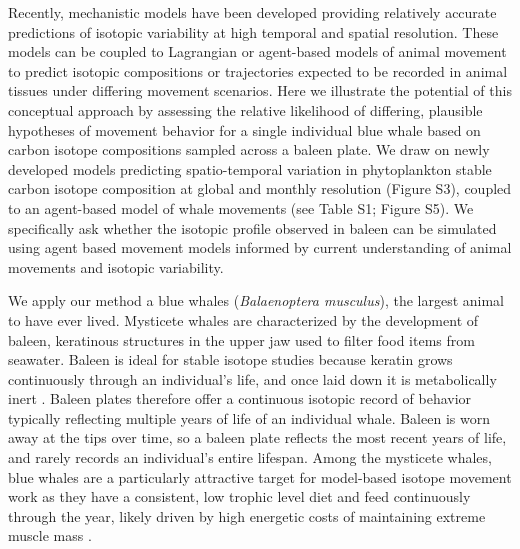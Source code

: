 \documentclass[a4paper,12pt]{article}
\begin{document}
Recently, mechanistic models have been developed providing relatively accurate predictions of isotopic variability at high temporal and spatial resolution. 
These models can be coupled to Lagrangian or agent-based models of animal movement to predict isotopic compositions or trajectories expected to be recorded in animal tissues under differing movement scenarios. 
Here we illustrate the potential of this conceptual approach by assessing the relative likelihood of differing, plausible hypotheses of movement behavior for a single individual blue whale based on carbon isotope compositions sampled across a baleen plate.  
We draw on newly developed models predicting spatio-temporal variation in phytoplankton stable carbon isotope composition at global and monthly resolution \citep{magozzi2017using} (Figure S3), coupled to an agent-based model of whale movements (see Table S1; Figure S5). 
We specifically ask whether the isotopic profile observed in baleen can be simulated using agent based movement models informed by current understanding of animal movements and isotopic variability.

We apply our method a blue whales (\textit{Balaenoptera musculus}), the largest animal to have ever lived. 
Mysticete whales are characterized by the development of baleen, keratinous structures in the upper jaw used to filter food items from seawater. 
Baleen is ideal for stable isotope studies because keratin grows continuously through an individual's life, and once laid down it is metabolically inert \citep{best1996stable,hobson1998stable}. 
Baleen plates therefore offer a continuous isotopic record of behavior typically reflecting multiple years of life of an individual whale. 
Baleen is worn away at the tips over time, so a baleen plate reflects the most recent years of life, and rarely records an individual's entire lifespan. 
Among the mysticete whales, blue whales are a particularly attractive target for model-based isotope movement work as they have a consistent, low trophic level diet and feed continuously through the year, likely driven by high energetic costs of maintaining extreme muscle mass \citep{goldbogen2015}.
\end{document}
